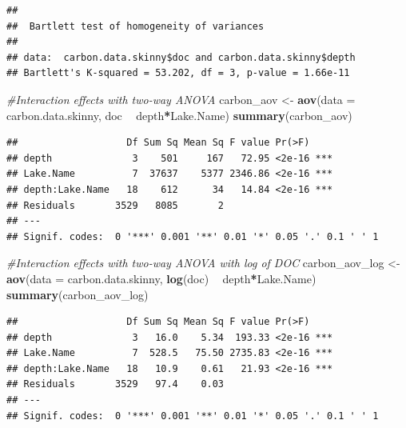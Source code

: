 \documentclass[12pt,]{article}
\newenvironment{Shaded}{\begin{snugshade}}{\end{snugshade}}
\newcommand{\KeywordTok}[1]{\textcolor[rgb]{0.13,0.29,0.53}{\textbf{#1}}}
\newcommand{\DataTypeTok}[1]{\textcolor[rgb]{0.13,0.29,0.53}{#1}}
\newcommand{\StringTok}[1]{\textcolor[rgb]{0.31,0.60,0.02}{#1}}
\newcommand{\CommentTok}[1]{\textcolor[rgb]{0.56,0.35,0.01}{\textit{#1}}}
\newcommand{\OperatorTok}[1]{\textcolor[rgb]{0.81,0.36,0.00}{\textbf{#1}}}
\newcommand{\NormalTok}[1]{#1}
\begin{document}
\begin{verbatim}
## 
##  Bartlett test of homogeneity of variances
## 
## data:  carbon.data.skinny$doc and carbon.data.skinny$depth
## Bartlett's K-squared = 53.202, df = 3, p-value = 1.66e-11
\end{verbatim}

\begin{Shaded}
\begin{Highlighting}[]
\CommentTok{#Interaction effects with two-way ANOVA}
\NormalTok{carbon_aov <-}\StringTok{ }\KeywordTok{aov}\NormalTok{(}\DataTypeTok{data =}\NormalTok{ carbon.data.skinny, doc }\OperatorTok{~}\StringTok{ }\NormalTok{depth}\OperatorTok{*}\NormalTok{Lake.Name)}
\KeywordTok{summary}\NormalTok{(carbon_aov)}
\end{Highlighting}
\end{Shaded}

\begin{verbatim}
##                   Df Sum Sq Mean Sq F value Pr(>F)    
## depth              3    501     167   72.95 <2e-16 ***
## Lake.Name          7  37637    5377 2346.86 <2e-16 ***
## depth:Lake.Name   18    612      34   14.84 <2e-16 ***
## Residuals       3529   8085       2                   
## ---
## Signif. codes:  0 '***' 0.001 '**' 0.01 '*' 0.05 '.' 0.1 ' ' 1
\end{verbatim}

\begin{Shaded}
\begin{Highlighting}[]
\CommentTok{#Interaction effects with two-way ANOVA with log of DOC}
\NormalTok{carbon_aov_log <-}\StringTok{ }\KeywordTok{aov}\NormalTok{(}\DataTypeTok{data =}\NormalTok{ carbon.data.skinny, }\KeywordTok{log}\NormalTok{(doc) }\OperatorTok{~}\StringTok{ }\NormalTok{depth}\OperatorTok{*}\NormalTok{Lake.Name)}
\KeywordTok{summary}\NormalTok{(carbon_aov_log) }
\end{Highlighting}
\end{Shaded}

\begin{verbatim}
##                   Df Sum Sq Mean Sq F value Pr(>F)    
## depth              3   16.0    5.34  193.33 <2e-16 ***
## Lake.Name          7  528.5   75.50 2735.83 <2e-16 ***
## depth:Lake.Name   18   10.9    0.61   21.93 <2e-16 ***
## Residuals       3529   97.4    0.03                   
## ---
## Signif. codes:  0 '***' 0.001 '**' 0.01 '*' 0.05 '.' 0.1 ' ' 1
\end{verbatim}
\end{document}
